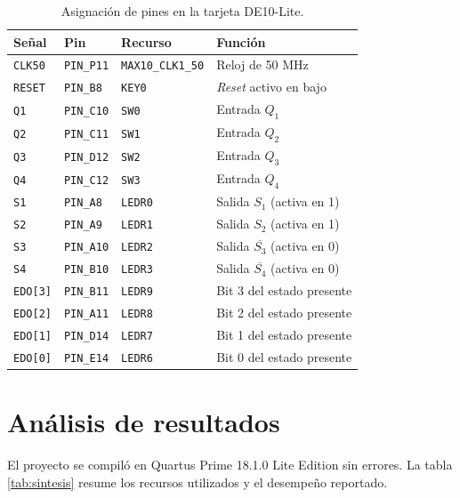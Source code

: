 \begin{table}[H]
  \centering
  \caption{Asignación de pines en la tarjeta DE10-Lite.}
  \label{tab:pines}
  \small
  \begin{tabular}{@{}l l l l@{}}
    \toprule
    \textbf{Señal} & \textbf{Pin} & \textbf{Recurso} & \textbf{Función} \\
    \midrule
    \texttt{CLK50}  & \texttt{PIN\_P11} & \texttt{MAX10\_CLK1\_50} & Reloj de 50 MHz \\
    \texttt{RESET}  & \texttt{PIN\_B8}  & \texttt{KEY0}   & \textit{Reset} activo en bajo \\
    \texttt{Q1}     & \texttt{PIN\_C10} & \texttt{SW0}    & Entrada $Q_1$ \\
    \texttt{Q2}     & \texttt{PIN\_C11} & \texttt{SW1}    & Entrada $Q_2$ \\
    \texttt{Q3}     & \texttt{PIN\_D12} & \texttt{SW2}    & Entrada $Q_3$ \\
    \texttt{Q4}     & \texttt{PIN\_C12} & \texttt{SW3}    & Entrada $Q_4$ \\
    \texttt{S1}     & \texttt{PIN\_A8}  & \texttt{LEDR0}  & Salida $S_1$ (activa en 1) \\
    \texttt{S2}     & \texttt{PIN\_A9}  & \texttt{LEDR1}  & Salida $S_2$ (activa en 1) \\
    \texttt{S3}     & \texttt{PIN\_A10} & \texttt{LEDR2}  & Salida $\overline{S_3}$ (activa en 0) \\
    \texttt{S4}     & \texttt{PIN\_B10} & \texttt{LEDR3}  & Salida $\overline{S_4}$ (activa en 0) \\
    \texttt{EDO[3]} & \texttt{PIN\_B11} & \texttt{LEDR9}  & Bit 3 del estado presente \\
    \texttt{EDO[2]} & \texttt{PIN\_A11} & \texttt{LEDR8}  & Bit 2 del estado presente \\
    \texttt{EDO[1]} & \texttt{PIN\_D14} & \texttt{LEDR7}  & Bit 1 del estado presente \\
    \texttt{EDO[0]} & \texttt{PIN\_E14} & \texttt{LEDR6}  & Bit 0 del estado presente \\
    \bottomrule
  \end{tabular}
\end{table}

\section{Análisis de resultados}

El proyecto se compiló en Quartus Prime 18.1.0 Lite Edition sin errores. La tabla
\ref{tab:sintesis} resume los recursos utilizados y el desempeño reportado.

